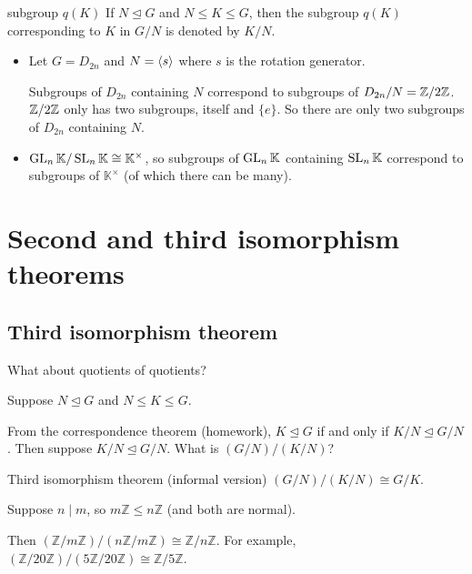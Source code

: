 \documentclass[12pt,letterpaper]{report}
\begin{document}
\begin{defn}{subgroup $q(K)$}{}
  If $N \trianglelefteq G$ and $N \leq K \leq G$, then the subgroup $q(K)$ corresponding to $K$ in
  $G/N$ is denoted by $K/N$.
\end{defn}

\begin{ex}
  \begin{itemize}
    \item Let $G = D_{2n}$ and $N = \langle s\rangle$ where $s$ is the rotation generator.

    Subgroups of $D_{2n}$ containing $N$ correspond to subgroups of $D_{2n}/N = \mathbb{Z}/{2}\mathbb{Z}$.
    $\mathbb{Z}/{2}\mathbb{Z}$ only has two subgroups, itself and $\{e\}$.
    So there are only two subgroups of $D_{2n}$ containing $N$.
    \item
    $\operatorname{GL}_n\mathbb{K}/\operatorname{SL}_n\mathbb{K} \cong \mathbb{K}^\times$, so subgroups of $\operatorname{GL}_n\mathbb{K}$
    containing $\operatorname{SL}_n\mathbb{K}$ correspond to subgroups of $\mathbb{K}^\times$ (of which there
    can be many).
  \end{itemize}
\end{ex}

\section{Second and third isomorphism theorems}

\subsection{Third isomorphism theorem}

What about quotients of quotients?

Suppose $N \trianglelefteq G$ and $N \leq K \leq G$.

From the correspondence theorem (homework), $K \trianglelefteq G$ if and only if
$K/N \trianglelefteq G/N$.
Then suppose $K/N \trianglelefteq G/N$.
What is $(G/N)/(K/N)$?

\begin{thm}{Third isomorphism theorem (informal version)}{}
  $(G/N)/(K/N) \cong G/K$.
\end{thm}

\begin{ex}
  Suppose $n \mid m$, so $m\mathbb{Z} \leq n\mathbb{Z}$ (and both are normal).

  Then $(\mathbb{Z}/m\mathbb{Z})/(n\mathbb{Z}/m\mathbb{Z}) \cong \mathbb{Z}/n\mathbb{Z}$.
  For example, $(\mathbb{Z}/20\mathbb{Z})/(5\mathbb{Z}/20\mathbb{Z}) \cong \mathbb{Z}/5\mathbb{Z}$.
\end{ex}
\end{document}
